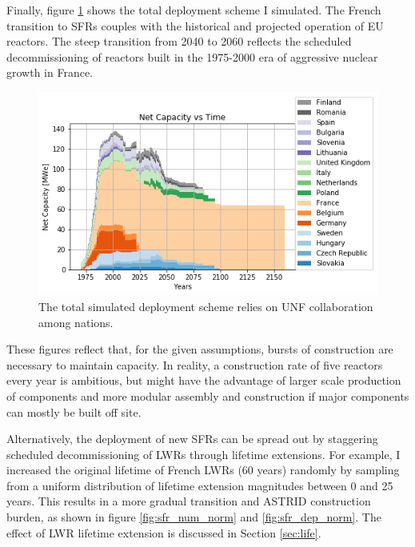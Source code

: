 Finally, figure \ref{fig:tot_dep} shows the total deployment scheme I simulated.  
The French transition to \glspl{SFR} couples with the historical and projected 
operation of \gls{EU} reactors.  The steep transition from 2040 to 2060 
reflects the scheduled decommissioning of reactors built in the 1975-2000 era 
of aggressive nuclear growth in France.

\begin{figure}[htbp!]
    \begin{center}
        \includegraphics[scale=0.7]{./images/eu_future/onesim.png}
    \end{center}
    \caption{The total simulated deployment scheme relies on \gls{UNF} 
    collaboration among nations.} 
    \label{fig:tot_dep}
\end{figure}

These figures reflect that, for the given assumptions, bursts of construction
are necessary to maintain capacity.  In reality, a construction rate of five 
reactors every year is ambitious, but might have the advantage of
larger scale production of components and more modular assembly and construction if major components can mostly be built off site.

Alternatively, the 
deployment of new \glspl{SFR} can be spread out by staggering scheduled 
decommissioning of \glspl{LWR} through lifetime extensions. For example,
I increased the original lifetime of French \glspl{LWR} (60 years) randomly 
by sampling from a uniform distribution of lifetime extension
magnitudes between 0 and 25 years. 
This results in a more gradual transition and \gls{ASTRID} construction
burden, as shown in figure \ref{fig:sfr_num_norm} and \ref{fig:sfr_dep_norm}.
The effect of \gls{LWR} lifetime extension is discussed in Section \ref{sec:life}.

